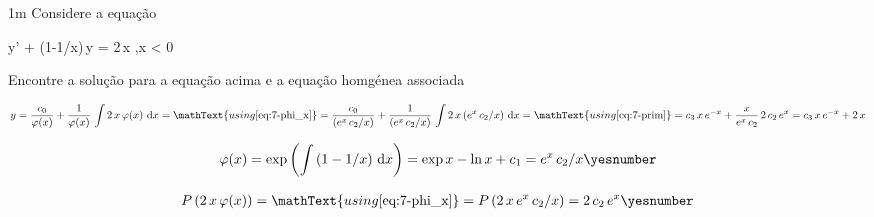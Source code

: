 \documentclass["AM3C-Slides_annotations.tex"]{subfiles}
\begin{document}
\begin{exampleBox}1m{} %
  Considere a equação
  \begin{BM}
    y' + (1-1/x)\,y = 2\,x 
    ,\quad x < 0
  \end{BM}
  Encontre a solução para a equação acima e a equação homgénea associada

  \answer{}

  \begin{gather*}
    y
    = \frac{c_0}{\varphi(x)}
    + \frac{1  }{\varphi(x)}
    \,\int{2\,x\,\varphi(x)\,\odif{x}}
    = \mathText{using \eqref{eq:7-phi_x}}
    = \frac{c_0}{(e^{x}\,c_2/x)}
    + \frac{1  }{(e^{x}\,c_2/x)}
    \,\int{2\,x\,(e^{x}\,c_2/x)\,\odif{x}}
    = \mathText{using \eqref{eq:7-prim}}
    = c_3\,x\,e^{-x}
    + \frac{x  }{e^{x}\,c_2}
    \,2\,c_2\,e^{x}
    = c_3\,x\,e^{-x}
    + 2\,x
  \end{gather*}

  \begin{gather*}
    \varphi(x) 
    = \exp{\left(
      \int{(1-1/x)\,\odif{x}}
    \right)}
    = \exp{
      x
      - \ln{x}
      + c_1
    }
    = e^{x}\,c_2/x
    \yesnumber\label{eq:7-phi_x}
  \end{gather*}

  \begin{gather*}
    P\left(
      2\,x\,\varphi(x)
    \right)
    = \mathText{using \eqref{eq:7-phi_x}}
    = P\left(
      2\,x\,e^{x}\,c_2/x
    \right)
    = 2\,c_2\,e^{x}
    \yesnumber\label{eq:7-prim}
  \end{gather*}

\end{exampleBox}
\end{document}
